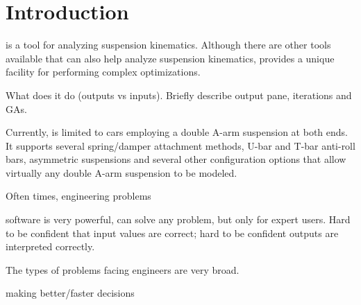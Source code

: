 \chapter{Introduction} \label{ch:introduction}


\vvase{} is a tool for analyzing suspension kinematics.  Although there are other tools available that can also help analyze suspension kinematics, \vvase{} provides a unique facility for performing complex optimizations.

What does it do (outputs vs inputs).  Briefly describe output pane, iterations and GAs.

Currently, \vvase{} is limited to cars employing a double A-arm suspension at both ends.  It supports several spring/damper attachment methods, U-bar and T-bar anti-roll bars, asymmetric suspensions and several other configuration options that allow virtually any double A-arm suspension to be modeled.

Often times, engineering problems 

software is very powerful, can solve any problem, but only for expert users.  Hard to be confident that input values are correct; hard to be confident outputs are interpreted correctly.

The types of problems facing engineers are very broad.

making better/faster decisions


